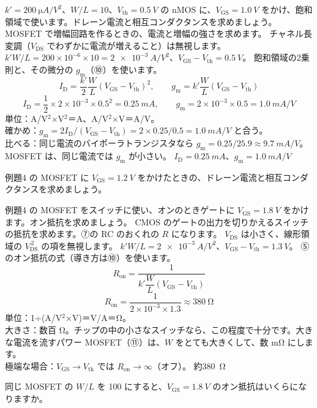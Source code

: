 \label{ph:原-10:ex4}
\begin{phreidai}
$k'=\qty{200}{\micro A/V^2}$、$W/L=10$、$V_{\mathrm{th}}=\qty{0.5}{V}$ の nMOS に、$V_{\mathrm{GS}}=\qty{1.0}{V}$ をかけ、飽和領域で使います。ドレーン電流と相互コンダクタンスを求めましょう。
\phbamen
MOSFET で増幅回路を作るときの、電流と増幅の強さを求めます。
\phmushi
チャネル長変調（$V_{\mathrm{DS}}$ でわずかに電流が増えること）は無視します。
\phzu
$k'W/L=200\times10^{-6}\times10=\qty{2e-3}{A/V^2}$、$V_{\mathrm{GS}}-V_{\mathrm{th}}=\qty{0.5}{V}$。
\phriyu
飽和領域の2乗則と、その微分の $g_{\mathrm m}$（⑩）を使います。
\phtateru
\[ I_{\mathrm D}=\frac{k'}{2}\frac WL(V_{\mathrm{GS}}-V_{\mathrm{th}})^2,\qquad g_{\mathrm m}=k'\frac WL(V_{\mathrm{GS}}-V_{\mathrm{th}}) \]
\phtoku
\[ I_{\mathrm D}=\frac12\times2\times10^{-3}\times0.5^2=\qty{0.25}{mA},\qquad g_{\mathrm m}=2\times10^{-3}\times0.5=\qty{1.0}{mA/V} \]
\phtashikame
単位：A/V$^2$×V$^2$＝A、A/V$^2$×V＝A/V。\\
確かめ：$g_{\mathrm m}=2I_{\mathrm D}/(V_{\mathrm{GS}}-V_{\mathrm{th}})=2\times0.25/0.5=\qty{1.0}{mA/V}$ と合う。\\
比べる：同じ電流のバイポーラトランジスタなら $g_{\mathrm m}=0.25/25.9\approx\qty{9.7}{mA/V}$。MOSFET は、同じ電流では $g_{\mathrm m}$ が小さい。
\kotae $I_{\mathrm D}=\qty{0.25}{mA}$、$g_{\mathrm m}=\qty{1.0}{mA/V}$
\end{phreidai}
\begin{jibun}
例題4 の MOSFET に $V_{\mathrm{GS}}=\qty{1.2}{V}$ をかけたときの、ドレーン電流と相互コンダクタンスを求めましょう。
\end{jibun}

\label{ph:原-10:ex5}
\begin{phreidai}[スイッチのオン抵抗]
例題4 の MOSFET をスイッチに使い、オンのときゲートに $V_{\mathrm{GS}}=\qty{1.8}{V}$ をかけます。オン抵抗を求めましょう。
\phbamen
CMOS のゲートの出力を切りかえるスイッチの抵抗を求めます。⑦の RC のおくれの $R$ になります。
\phmushi
$V_{\mathrm{DS}}$ は小さく、線形領域の $V_{\mathrm{DS}}^{\,2}$ の項を無視します。
\phzu
$k'W/L=\qty{2e-3}{A/V^2}$、$V_{\mathrm{GS}}-V_{\mathrm{th}}=\qty{1.3}{V}$。
\phriyu
⑤のオン抵抗の式（導き方は⑩）を使います。
\phtateru
\[ R_{\mathrm{on}}=\frac{1}{k'\dfrac WL(V_{\mathrm{GS}}-V_{\mathrm{th}})} \]
\phtoku
\[ R_{\mathrm{on}}=\frac{1}{2\times10^{-3}\times1.3}\approx\qty{380}{\ohm} \]
\phtashikame
単位：1÷(A/V$^2$×V)＝V/A＝Ω。\\
大きさ：数百 Ω。チップの中の小さなスイッチなら、この程度で十分です。大きな電流を流すパワー MOSFET（⑪）は、$W$ をとても大きくして、数 mΩ にします。\\
極端な場合：$V_{\mathrm{GS}}\to V_{\mathrm{th}}$ では $R_{\mathrm{on}}\to\infty$（オフ）。
\kotae 約\qty{380}{\ohm}
\end{phreidai}
\begin{jibun}
同じ MOSFET の $W/L$ を 100 にすると、$V_{\mathrm{GS}}=\qty{1.8}{V}$ のオン抵抗はいくらになりますか。
\end{jibun}

